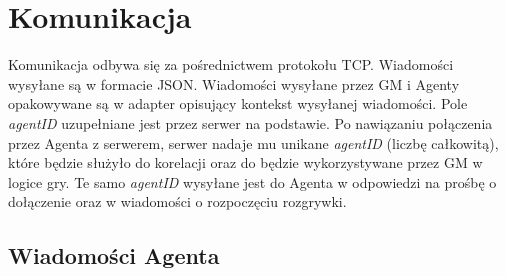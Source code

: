 \documentclass[Dokumentacja.tex]{subfiles}
\begin{document}
\section{Komunikacja}
Komunikacja odbywa się za pośrednictwem protokołu TCP. Wiadomości wysyłane są w formacie JSON.
Wiadomości wysyłane przez GM i Agenty opakowywane są w adapter opisujący kontekst wysyłanej wiadomości.
Pole \textit{agentID} uzupełniane jest przez serwer na podstawie. Po nawiązaniu połączenia przez Agenta z serwerem,
serwer nadaje mu unikane \textit{agentID} (liczbę całkowitą), które będzie służyło do korelacji oraz do będzie
wykorzystywane przez GM w logice gry. Te samo \textit{agentID} wysyłane jest do Agenta w odpowiedzi na prośbę o dołączenie
oraz w wiadomości o rozpoczęciu rozgrywki.


\subsection{Wiadomości Agenta}









\end{document}
